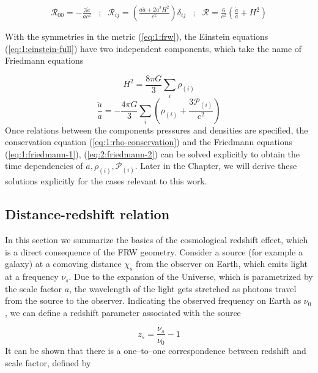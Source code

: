 \begin{equation}
\label{eq:1:ricci}
\begin{matrix}
\displaystyle \mathcal{R}_{00} = -\frac{3\ddot{a}}{ac^2} & ; & \displaystyle \mathcal{R}_{ij} = \left(\frac{a\ddot{a}+2a^2H^2}{c^2}\right)\delta_{ij} & ; & \displaystyle \mathcal{R} = \frac{6}{c^2}\left(\frac{\ddot{a}}{a}+H^2\right) \\ \\ 
\end{matrix}
\end{equation}
%
With the symmetries in the metric (\ref{eq:1:frw}), the Einstein equations (\ref{eq:1:einstein-full}) have two independent components, which take the name of Friedmann equations 

\begin{equation}
\label{eq:1:friedmann-1}
H^2 = \frac{8\pi G}{3}\sum_i\rho_{(i)}
\end{equation} 
%
\begin{equation}
\label{eq:2:friedmann-2}
\frac{\ddot{a}}{a} = -\frac{4\pi G}{3}\sum_i\left(\rho_{(i)}+\frac{3\mathcal{P}_{(i)}}{c^2}\right)
\end{equation}
%
Once relations between the components pressures and densities are specified, the conservation equation (\ref{eq:1:rho-conservation}) and the Friedmann equations (\ref{eq:1:friedmann-1}), (\ref{eq:2:friedmann-2}) can be solved explicitly to obtain the time dependencies of $a,\rho_{(i)},\mathcal{P}_{(i)}$. Later in the Chapter, we will derive these solutions explicitly for the cases relevant to this work.  

\subsection{Distance-redshift relation}
In this section we summarize the basics of the cosmological redshift effect, which is a direct consequence of the FRW geometry. Consider a source (for example a galaxy) at a comoving distance $\chi_s$ from the observer on Earth, which emits light at a frequency $\nu_s$. Due to the expansion of the Universe, which is parametrized by the scale factor $a$, the wavelength of the light gets stretched as photons travel from the source to the observer. Indicating the observed frequency on Earth as $\nu_0$, we can define a redshift parameter associated with the source

\begin{equation}
\label{eq:1:redshift}
z_s = \frac{\nu_s}{\nu_0}-1
\end{equation}  
%
It can be shown that there is a one--to--one correspondence between redshift and scale factor, defined by

